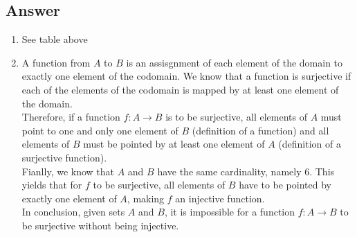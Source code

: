 \subsection{Answer}

\begin{enumerate}
	\item See table above
	\item A function from $A$ to $B$ is an assisgnment of each element of the domain to exactly one element of the codomain.
	We know that a function is surjective if each of the elements of the codomain is mapped by at least one element of the domain.
	\\
	Therefore, if a function $f : A \rightarrow B$ is to be surjective, all elements of $A$ must point to one and only one 
	element of $B$ (definition of a function) and all elements of $B$ must be pointed by at least one element of $A$ (definition
	of a surjective function).
	\\
	Fianlly, we know that $A$ and $B$ have the same cardinality, namely 6. This yields that for $f$ to be surjective, all elements
	of $B$ have to be pointed by exactly one element of $A$, making $f$ an injective function. 
	\\
	In conclusion, given sets $A$ and $B$, it is impossible for a function $f : A \rightarrow B$ to be surjective without
	being injective.  
\end{enumerate}
